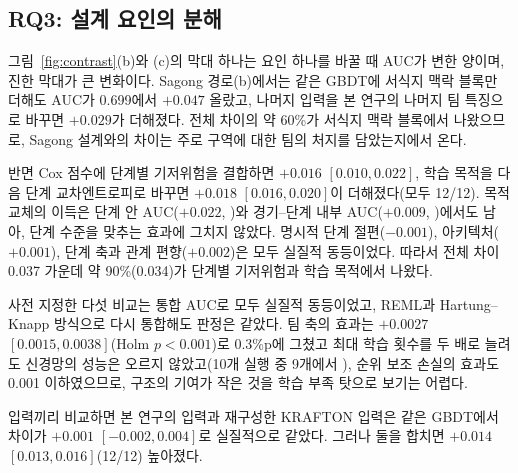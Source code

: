 \subsection{RQ3: 설계 요인의 분해}
\label{sec:results:rq3}

그림~\ref{fig:contrast}(b)와 (c)의 막대 하나는 요인 하나를 바꿀 때 AUC가 변한 양이며, 진한 막대가 큰 변화이다.
Sagong 경로(b)에서는 같은 GBDT에 서식지 맥락 블록만 더해도 AUC가 0.699에서 $+0.047$ 올랐고, 나머지 입력을 본 연구의 나머지 팀 특징으로 바꾸면 $+0.029$가 더해졌다.
전체 차이의 약 60\%가 서식지 맥락 블록에서 나왔으므로, Sagong 설계와의 차이는 주로 구역에 대한 팀의 처지를 담았는지에서 온다.

반면 Cox 점수에 단계별 기저위험을 결합하면 $+0.016$ $[0.010, 0.022]$, 학습 목적을 다음 단계 교차엔트로피로 바꾸면 $+0.018$ $[0.016, 0.020]$이 더해졌다(모두 12/12).
목적 교체의 이득은 단계 안 AUC($+0.022$, )와 경기--단계 내부 AUC($+0.009$, )에서도 남아, 단계 수준을 맞추는 효과에 그치지 않았다.
명시적 단계 절편($-0.001$), 아키텍처($+0.001$), 단계 축과 관계 편향($+0.002$)은  모두 실질적 동등이었다.
따라서  전체 차이 0.037 가운데 약 90\%(0.034)가 단계별 기저위험과 학습 목적에서 나왔다.

사전 지정한 다섯 비교는 통합 AUC로 모두 실질적 동등이었고, REML과 Hartung--Knapp 방식으로 다시 통합해도 판정은 같았다.
팀 축의 효과는 $+0.0027$ $[0.0015, 0.0038]$(Holm $p<0.001$)로 0.3\%p에 그쳤고
최대 학습 횟수를 두 배로 늘려도 신경망의 성능은 오르지 않았고(10개 실행 중 9개에서 ), 순위 보조 손실의 효과도 0.001 이하였으므로, 구조의 기여가 작은 것을 학습 부족 탓으로 보기는 어렵다.

입력끼리 비교하면 본 연구의 입력과 재구성한 KRAFTON 입력은 같은 GBDT에서 차이가 $+0.001$ $[-0.002, 0.004]$로 실질적으로 같았다.
그러나 둘을 합치면 $+0.014$ $[0.013, 0.016]$(12/12) 높아졌다.
